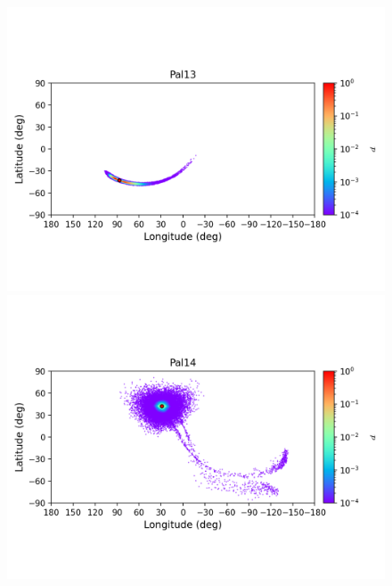 \begin{figure}
\begin{center}
                \includegraphics[clip=true, trim = 0mm 20mm 0mm 10mm, width=1\columnwidth]{images/error_plots_Pal13.png}
                \includegraphics[clip=true, trim = 0mm 20mm 0mm 10mm, width=1\columnwidth]{images/error_plots_Pal14.png}
                

\end{center}
\end{figure}
